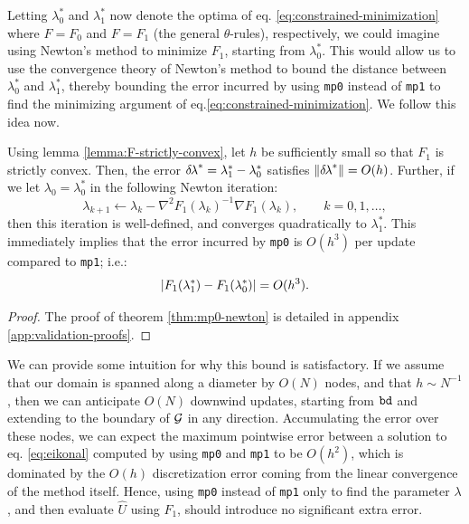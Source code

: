 \documentclass[smallcondensed]{svjour3}
\begin{document}
Letting $\lambda_0^*$ and $\lambda_1^*$ now denote the optima of eq.\@
\ref{eq:constrained-minimization} where $F = F_0$ and $F = F_1$ (the
general $\theta$-rules), respectively, we could imagine using Newton's
method to minimize $F_1$, starting from $\lambda_0^*$. This would
allow us to use the convergence theory of Newton's method to bound the
distance between $\lambda_0^*$ and $\lambda_1^*$, thereby bounding the
error incurred by using \texttt{mp0} instead of \texttt{mp1} to find
the minimizing argument of eq.\@ \ref{eq:constrained-minimization}. We
follow this idea now.

\begin{theorem}\label{thm:mp0-newton}
  Using lemma \ref{lemma:F-strictly-convex}, let $h$ be sufficiently
  small so that $F_1$ is strictly convex. Then, the error
  ${\delta \hspace{-0.1em} \lambda}^* = \lambda_1^* - \lambda_0^*$ satisfies
  $\left\|{\delta \hspace{-0.1em} \lambda}^*\right\| = O(h)$. Further, if we let
  $\lambda_0 = \lambda_0^*$ in the following Newton iteration:
  \begin{equation}
    \label{eq:lam0-iter-to-lam1}
    \lambda_{k+1} \gets \lambda_k - \nabla^2 F_1(\lambda_k)^{-1} \nabla F_1(\lambda_k), \qquad k = 0, 1, \hdots,
  \end{equation}
  then this iteration is well-defined, and converges quadratically to
  $\lambda_1^*$. This immediately implies that the error incurred by
  \texttt{mp0} is $O(h^3)$ per update compared to \texttt{mp1}; i.e.:
  \begin{equation}
    \label{eq:mp0-error}
    \left|F_1(\lambda_1^*) - F_1(\lambda_0^*)\right| = O(h^3).
  \end{equation}
\end{theorem}

\begin{proof}
  The proof of theorem \ref{thm:mp0-newton} is detailed in appendix
  \ref{app:validation-proofs}.
\end{proof}

We can provide some intuition for why this bound is satisfactory. If
we assume that our domain is spanned along a diameter by $O(N)$ nodes,
and that $h \sim N^{-1}$, then we can anticipate $O(N)$ downwind
updates, starting from $\texttt{bd}$ and extending to the boundary of
$\mathcal{G}$ in any direction. Accumulating the error over these nodes, we
can expect the maximum pointwise error between a solution to eq.\@
\ref{eq:eikonal} computed by using \texttt{mp0} and \texttt{mp1} to be
$O(h^2)$, which is dominated by the $O(h)$ discretization error coming
from the linear convergence of the method itself. Hence, using
\texttt{mp0} instead of \texttt{mp1} only to find the parameter
$\lambda$, and then evaluate $\hat{U}$ using $F_1$, should introduce
no significant extra error.
\end{document}
